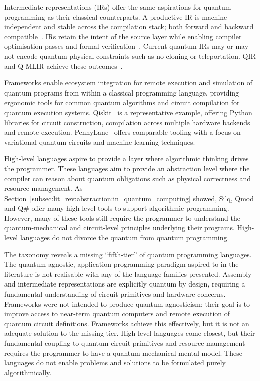 Intermediate representations (IRs) offer the same aspirations for quantum programming as their classical counterparts.
A productive IR is machine-independent and stable across the compilation stack; both forward and backward compatible~\cite{irreview2024}.
IRs retain the intent of the source layer while enabling compiler optimisation passes and formal verification~\cite{irreview2024}.
Current quantum IRs may or may not encode quantum-physical constraints such as no-cloning or teleportation.
QIR and Q-MLIR achieve these outcomes~\cite{irreview2024}.

Frameworks enable ecosystem integration for remote execution and simulation of quantum programs from within a classical programming language, providing ergonomic tools for common quantum algorithms and circuit compilation for quantum execution systems.
Qiskit~\cite{aleksandrowicz2019qiskit} is a representative example, offering Python libraries for circuit construction, compilation across multiple hardware backends and remote execution.
PennyLane~\cite{bergholm2018pennylane} offers comparable tooling with a focus on variational quantum circuits and machine learning techniques.

High-level languages aspire to provide a layer where algorithmic thinking drives the programmer.
These languages aim to provide an abstraction level where the compiler can reason about quantum obligations such as physical correctness and resource management.
As Section~\ref{subsec:lit_rev:abstraction:in_quantum_computing} showed, Silq, Qmod and Q\# offer many high-level tools to support algorithmic programming.
However, many of these tools still require the programmer to understand the quantum-mechanical and circuit-level principles underlying their programs.
High-level languages do not divorce the quantum from quantum programming.

The taxonomy reveals a missing ``fifth-tier'' of quantum programming languages.
The quantum-agnostic, application programming paradigm aspired to in the literature is not realisable with any of the language families presented.
Assembly and intermediate representations are explicitly quantum by design, requiring a fundamental understanding of circuit primitives and hardware concerns.
Frameworks were not intended to produce quantum-agnosticism; their goal is to improve access to near-term quantum computers and remote execution of quantum circuit definitions.
Frameworks achieve this effectively, but it is not an adequate solution to the missing tier.
High-level languages come closest, but their fundamental coupling to quantum circuit primitives and resource management requires the programmer to have a quantum mechanical mental model.
These languages do not enable problems and solutions to be formulated purely algorithmically.

